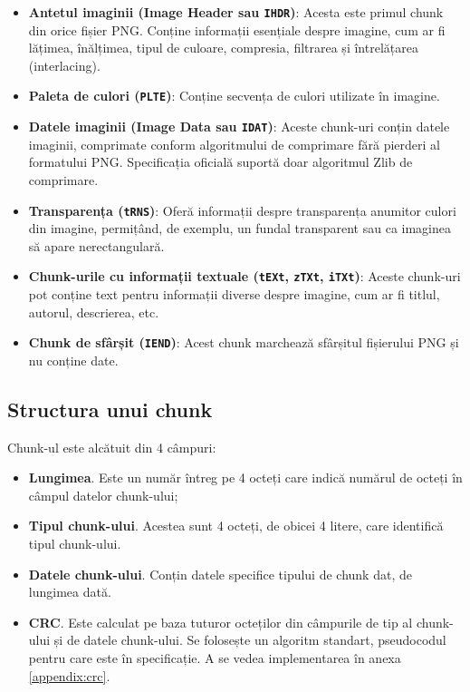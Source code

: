 \documentclass[a4paper,12pt]{report}
\begin{document}
\begin{itemize}
  \item
      \textbf{Antetul imaginii (Image Header sau \texttt{IHDR})}:
      Acesta este primul chunk din orice fișier \ac{PNG}.
      Conține informații esențiale despre imagine, cum ar fi lățimea,
      înălțimea, tipul de culoare, compresia, filtrarea și întrelățarea (interlacing).

  \item
      \textbf{Paleta de culori (\texttt{PLTE})}:
      Conține secvența de culori utilizate în imagine.

  \item
      \textbf{Datele imaginii (Image Data sau \texttt{IDAT})}:
      Aceste chunk-uri conțin datele imaginii,
      comprimate conform algoritmului de comprimare fără pierderi al formatului \ac{PNG}.
      Specificația oficială suportă doar algoritmul Zlib de comprimare.

  \item
      \textbf{Transparența (\texttt{tRNS})}:
      Oferă informații despre transparența anumitor culori din imagine,
      permițând, de exemplu, un fundal transparent sau ca imaginea să apare nerectangulară.

  \item
      \textbf{Chunk-urile cu informații textuale (\texttt{tEXt}, \texttt{zTXt}, \texttt{iTXt})}:
      Aceste chunk-uri pot conține text pentru informații diverse despre imagine,
        cum ar fi titlul, autorul, descrierea, etc.

  \item
      \textbf{Chunk de sfârșit (\texttt{IEND})}:
      Acest chunk marchează sfârșitul fișierului \ac{PNG} și nu conține date.
\end{itemize}

\subsection{Structura unui chunk}

Chunk-ul este alcătuit din 4 câmpuri:
\begin{itemize}
    \item \textbf{Lungimea}. Este un număr întreg pe 4 octeți care indică numărul de octeți în câmpul datelor chunk-ului;
    \item \textbf{Tipul chunk-ului}. Acestea sunt 4 octeți, de obicei 4 litere, care identifică tipul chunk-ului.
    \item \textbf{Datele chunk-ului}. Conțin datele specifice tipului de chunk dat, de lungimea dată.
    \item \textbf{\ac{CRC}}.
        Este calculat pe baza tuturor octeților din câmpurile de tip al chunk-ului și de datele chunk-ului. 
        Se folosește un algoritm standart, pseudocodul pentru care este în specificație.
        A se vedea implementarea în anexa \ref{appendix:crc}.
\end{itemize}
\end{document}
